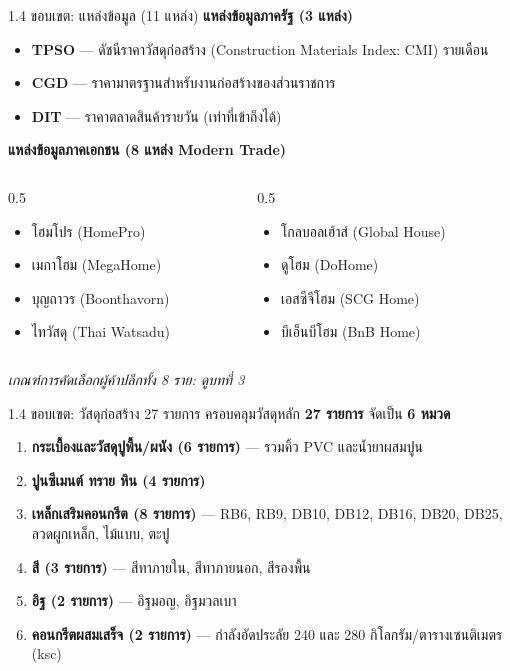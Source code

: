 \documentclass[aspectratio=169,11pt]{beamer}
\begin{document}
\begin{frame}{1.4 ขอบเขต: แหล่งข้อมูล (11 แหล่ง)}
  \textbf{แหล่งข้อมูลภาครัฐ (3 แหล่ง)}
  \begin{itemize}
    \item \textbf{TPSO} --- ดัชนีราคาวัสดุก่อสร้าง (Construction Materials Index: CMI)
          รายเดือน
    \item \textbf{CGD} --- ราคามาตรฐานสำหรับงานก่อสร้างของส่วนราชการ
    \item \textbf{DIT} --- ราคาตลาดสินค้ารายวัน (เท่าที่เข้าถึงได้)
  \end{itemize}
  \vspace{0.3em}
  \textbf{แหล่งข้อมูลภาคเอกชน (8 แหล่ง Modern Trade)}
  \begin{columns}[T,onlytextwidth]
    \begin{column}{0.5\textwidth}
      \begin{itemize}
        \item โฮมโปร (HomePro)
        \item เมกาโฮม (MegaHome)
        \item บุญถาวร (Boonthavorn)
        \item ไทวัสดุ (Thai Watsadu)
      \end{itemize}
    \end{column}
    \begin{column}{0.5\textwidth}
      \begin{itemize}
        \item โกลบอลเฮ้าส์ (Global House)
        \item ดูโฮม (DoHome)
        \item เอสซีจีโฮม (SCG Home)
        \item บีเอ็นบีโฮม (BnB Home)
      \end{itemize}
    \end{column}
  \end{columns}
  \vspace{0.3em}
  \footnotesize\emph{เกณฑ์การคัดเลือกผู้ค้าปลีกทั้ง 8 ราย: ดูบทที่ 3}
\end{frame}

\begin{frame}{1.4 ขอบเขต: วัสดุก่อสร้าง 27 รายการ}
  ครอบคลุมวัสดุหลัก \textbf{27 รายการ} จัดเป็น \textbf{6 หมวด}
  \begin{enumerate}
    \item \textbf{กระเบื้องและวัสดุปูพื้น/ผนัง (6 รายการ)} --- รวมคิ้ว PVC
          และน้ำยาผสมปูน
    \item \textbf{ปูนซีเมนต์ ทราย หิน (4 รายการ)}
    \item \textbf{เหล็กเสริมคอนกรีต (8 รายการ)} --- RB6, RB9, DB10, DB12, DB16,
          DB20, DB25, ลวดผูกเหล็ก, ไม้แบบ, ตะปู
    \item \textbf{สี (3 รายการ)} --- สีทาภายใน, สีทาภายนอก, สีรองพื้น
    \item \textbf{อิฐ (2 รายการ)} --- อิฐมอญ, อิฐมวลเบา
    \item \textbf{คอนกรีตผสมเสร็จ (2 รายการ)} --- กำลังอัดประลัย 240 และ 280
          กิโลกรัม/ตารางเซนติเมตร (ksc)
  \end{enumerate}
\end{frame}
\end{document}
